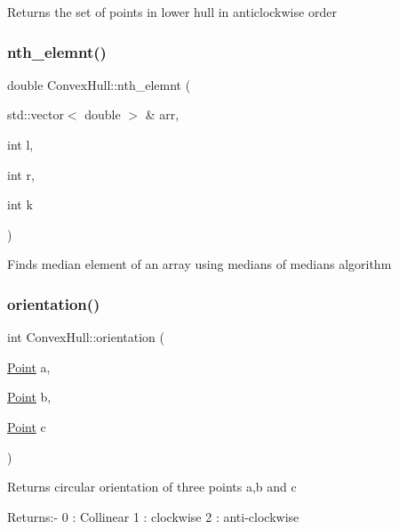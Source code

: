 Returns the set of points in lower hull in anticlockwise order \mbox{\label{classConvexHull_a582497a1ae56330653d543a2a17b7ccf}} 
\subsubsection{\texorpdfstring{nth\+\_\+elemnt()}{nth\_elemnt()}}
{\footnotesize\ttfamily double Convex\+Hull\+::nth\+\_\+elemnt (\begin{DoxyParamCaption}\item[{std\+::vector$<$ double $>$ \&}]{arr,  }\item[{int}]{l,  }\item[{int}]{r,  }\item[{int}]{k }\end{DoxyParamCaption})\hspace{0.3cm}{\ttfamily [private]}}

Finds median element of an array using medians of medians algorithm \mbox{\label{classConvexHull_a0ae8784263b86fd85bfb2c545b2e61d5}} 
\subsubsection{\texorpdfstring{orientation()}{orientation()}}
{\footnotesize\ttfamily int Convex\+Hull\+::orientation (\begin{DoxyParamCaption}\item[{\hyperlink{classPoint}{Point}}]{a,  }\item[{\hyperlink{classPoint}{Point}}]{b,  }\item[{\hyperlink{classPoint}{Point}}]{c }\end{DoxyParamCaption})\hspace{0.3cm}{\ttfamily [private]}}

Returns circular orientation of three points \textquotesingle{}a\textquotesingle{},\textquotesingle{}b\textquotesingle{} and \textquotesingle{}c\textquotesingle{}

Returns\+:-\/ 0 \+: Collinear 1 \+: clockwise 2 \+: anti-\/clockwise \mbox{\label{classConvexHull_a40a096aa99d63b40043cebf56b9049d1}} 
